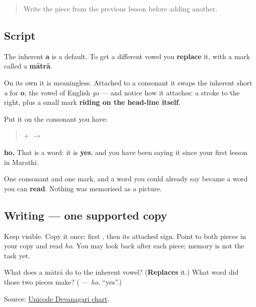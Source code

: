 \label{lesson:MR-W01-o-matra}



\begin{quote}
Write the piece from the previous lesson before adding another.
\end{quote}

\subsection*{Script}
The inherent \textbf{a} is a default. To get a different vowel you \textbf{replace} it, with a mark called a \textbf{mātrā}.

\begin{quote}
\end{quote}

On its own it is meaningless. Attached to a consonant it swaps the inherent short \emph{a} for \textbf{o}, the vowel of English \emph{go} — and notice how it attaches: a stroke to the right, plus a small mark \textbf{riding on the head-line itself}.

Put it on the consonant you have:

\begin{quote}
\textbf{} + \textbf{} $\to$ \textbf{}
\end{quote}

\textbf{ho.} That is a word: it is \textbf{yes}, and you have been saying it since your first lesson in Marathi.

One consonant and one mark, and a word you could already say became a word you can \textbf{read}. Nothing was memorised as a picture.

\subsection*{Writing — one supported copy}
Keep \textbf{} visible. Copy it once: first \textbf{}, then its attached \textbf{} sign. Point to both pieces in your copy and read \emph{ho}. You may look back after each piece; memory is not the task yet.

\begin{tcolorbox}[breakable,colback=teal!4,colframe=teal!35!black,title={Before you move on}]
What does a mātrā do to the inherent vowel? (\textbf{Replaces} it.) What word did those two pieces make? (\textbf{} — \emph{ho}, \textquotedblleft{}yes\textquotedblright{}.)

Source: \href{https://www.unicode.org/charts/PDF/U0900.pdf}{Unicode Devanagari chart}.
\end{tcolorbox}
